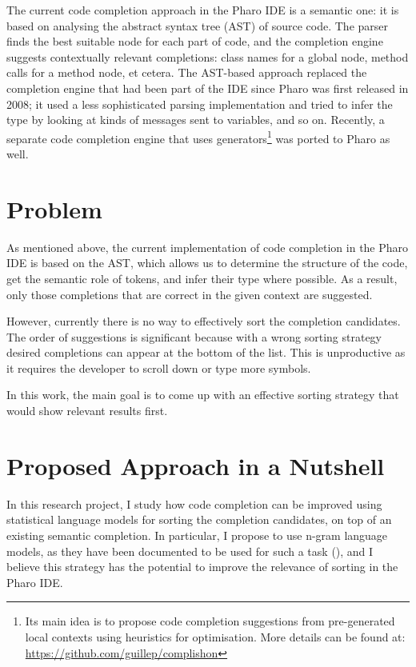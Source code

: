 The current code completion approach in the Pharo IDE is a semantic one: it is based on analysing the abstract syntax tree (AST) of source code. The parser finds the best suitable node for each part of code, and the completion engine suggests contextually relevant completions: class names for a global node, method calls for a method node, et cetera. The AST-based approach replaced the completion engine that had been part of the IDE since Pharo was first released in 2008; it used a less sophisticated parsing implementation and tried to infer the type by looking at kinds of messages sent to variables, and so on. Recently, a separate code completion engine that uses generators\footnote{Its main idea is to propose code completion suggestions from pre-generated local contexts using heuristics for optimisation. More details can be found at: \url{https://github.com/guillep/complishon}} was ported to Pharo as well.

\section{Problem}
\label{sec:Introduction-Problem}
As mentioned above, the current implementation of code completion in the Pharo IDE is based on the AST, which allows us to determine the structure of the code, get the semantic role of tokens, and infer their type where possible. As a result, only those completions that are correct in the given context are suggested.

However, currently there is no way to effectively sort the completion candidates. The order of suggestions is significant because with a wrong sorting strategy desired completions can appear at the bottom of the list. This is unproductive as it requires the developer to scroll down or type more symbols. 

In this work, the main goal is to come up with an effective sorting strategy that would show relevant results first. 

\section{Proposed Approach in a Nutshell}
\label{sec:Introduction-Approach}
In this research project, I study how code completion can be improved using statistical language models for sorting the completion candidates, on top of an existing semantic completion. In particular, I propose to use n-gram language models, as they have been documented to be used for such a task (\cite{Hind12a}), and I believe this strategy has the potential to improve the relevance of sorting in the Pharo IDE.

